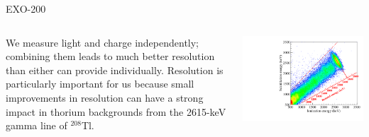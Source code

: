 \documentclass[final]{beamer} %
\begin{document}
\begin{frame}{}
\begin{columns}[t]
\begin{column}{.3\linewidth}
\begin{block}{\large EXO-200}
      \begin{columns}
        \begin{column}{0.49\linewidth}
          We measure light and charge independently; combining them leads to much better resolution than either can provide individually.  Resolution is particularly important for us because small improvements in resolution can have a strong impact in thorium backgrounds from the 2615-keV gamma line of $^{208}$Tl.
        \end{column}
        \begin{column}{0.49\linewidth}
          \includegraphics[keepaspectratio=true,width=\textwidth]{RotationTh2D_withCalibration.pdf}
        \end{column}
      \end{columns}


\end{block}
\end{column}
\end{columns}
\end{frame}
\end{document}
